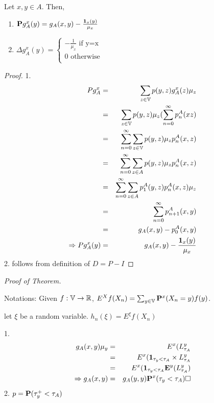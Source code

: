 \documentclass[main]{subfiles}
\begin{document}
\begin{lemma}
     Let $x,y \in A$. Then,
     \begin{enumerate}
          \item $\mathbf{P}g_A^x(y)= g_A(x,y)-\frac{\1_x(y)}{\mu_x}$
          \item $\Delta g_A^x(y)=
                     \begin{cases}
                          -\frac{1}{\mu_x} \text{  	if y=x} \\
                          0 \text{ 	 otherwise}             \\
                     \end{cases}$
     \end{enumerate}
\end{lemma}
\begin{proof}
     1.
     \begin{eqnarray*}
          Pg_A^x&=& \sum_{z \in \V} p(y,z)g_A^x(z)\mu_z \\
          &=& \sum_{z \in \V} p(y,z)\mu_z (\suminf p_n^A(xz) \\
          &=& \suminf \sum_{z \in \V} p(y,z)\mu_z p_n^A(x,z) \\
          &=& \suminf \sum_{z \in A} p(y,z)\mu_z p_n^A(x,z) \\
          &=& \suminf \sum_{z \in A} p_1^A(y,z)p_n^A(x,z)\mu_z \\
          &=& \suminf p_{n+1}^A(x,y) \\
          &=& g_A(x,y) - p_0^A(x,y) \\
          \Rightarrow Pg_A^x(y)&=&g_A(x,y)-\frac{\1_x(y)}{\mu_x}
     \end{eqnarray*}
     2. follows from definition of $D=P-I$
\end{proof}

\textit{Proof of Theorem.}

Notations: Given $f: \V \rightarrow \R$, $E^Xf(X_n)=\sum_{y \in \V} \P^x(X_n=y)f(y)$.

let $\xi$ be a random variable. $h_n(\xi)=E^{\xi} f(X_n)$

1.
\begin{eqnarray*}
     g_A(x,y)\mu_y &=& E^x(L_{\tau_A}^y \\
     &=& E^x(\1_{\tau_y < \tau_A} \times L_{\tau_A}^y \\
     &=& E^x(\1_{\tau_y < \tau_A} \E^y (L_{\tau_A}^y) \\
     \Rightarrow g_A(x,y) &=& g_A(y,y)\P^x(\tau_y < \tau_A) \square
\end{eqnarray*}
2. $p=\P(\tau_y^+<\tau_A)$
\end{document}
